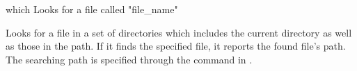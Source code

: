 \begin{nusmvCommand} {which} {Looks for a file called "file\_name"}


Looks for a file in a set of directories which includes the current
directory as well as those in the \nusmv path.  If it finds the
specified file, it reports the found file's path.  The searching path
is specified through the  command in
.\\

\begin{cmdOpt}
\end{cmdOpt}

\end{nusmvCommand}
